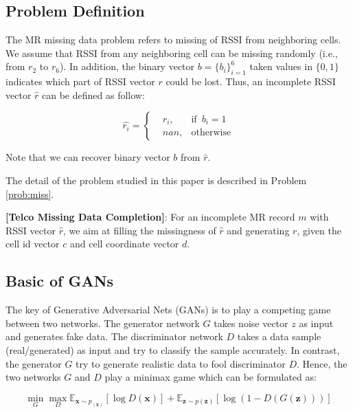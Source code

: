 \subsection{Problem Definition}
The MR missing data problem refers to missing of RSSI from neighboring cells. We assume that RSSI from any neighboring cell can be missing randomly (i.e., from $r_2$ to $r_6$). In addition, the binary vector $b=\{b_i\}_{i=1}^6$ taken values in $\{0, 1\}$ indicates which part of RSSI vector $r$ could be lost. Thus, an incomplete RSSI vector $\hat{r}$ can be defined as follow:

\begin{equation}\label{eq:rssi}
\hat{r_i}=\left\{
\begin{aligned}
&r_i, & \text{if}\enspace b_i=1 \\
&nan,  & \text{otherwise}
\end{aligned}
\right.
\end{equation}

Note that we can recover binary vector $b$ from $\hat{r}$.

The detail of the problem studied in this paper is described in Problem \ref{prob:miss}.

\begin{problem}\label{prob:miss}
  \textbf{[Telco Missing Data Completion]}: For an incomplete MR record $m$ with RSSI vector $\hat{r}$, we aim at filling the missingness of $\hat{r}$ and generating $r$, given the cell id vector $c$ and cell coordinate vector $d$.
\end{problem}

\subsection{Basic of GANs}
The key of Generative Adversarial Nets (GANs) \cite{DBLP:conf/nips/GoodfellowPMXWOCB14} is to play a competing game between two networks. The generator network $G$ takes noise vector $z$ as input and generates fake data. The discriminator network $D$ takes a data sample (real/generated) as input and try to classify the sample accurately. In contrast, the generator $G$ try to generate realistic data to fool discriminator $D$. Hence, the two networks $G$ and $D$ play a minimax game which can be formulated as:

\begin{equation}\label{eq:gan}
  \min\limits_G \max\limits_D \mathbb{E}_{\textbf{x}\sim p_(\textbf{x})}[\log D(\textbf{x})]+\mathbb{E}_{\textbf{z}\sim p( \textbf{z})}[\log(1-D(G(\textbf{z})))]
\end{equation}

